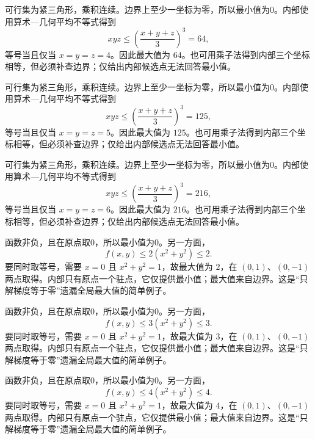 \documentclass[UTF8,12pt,a4paper,fontset=fandol]{ctexart}
\begin{document}
\begin{solve}\label{ans:c35q10}
可行集为紧三角形，乘积连续。边界上至少一坐标为零，所以最小值为0。内部使用算术—几何平均不等式得到
\[
xyz\le\left(\frac{x+y+z}3\right)^3=64,
\]
等号当且仅当 $x=y=z=4$。因此最大值为 $64$。也可用乘子法得到内部三个坐标相等，但必须补查边界；仅给出内部候选点无法回答最小值。
\end{solve}

\begin{solve}\label{ans:c35q11}
可行集为紧三角形，乘积连续。边界上至少一坐标为零，所以最小值为0。内部使用算术—几何平均不等式得到
\[
xyz\le\left(\frac{x+y+z}3\right)^3=125,
\]
等号当且仅当 $x=y=z=5$。因此最大值为 $125$。也可用乘子法得到内部三个坐标相等，但必须补查边界；仅给出内部候选点无法回答最小值。
\end{solve}

\begin{solve}\label{ans:c35q12}
可行集为紧三角形，乘积连续。边界上至少一坐标为零，所以最小值为0。内部使用算术—几何平均不等式得到
\[
xyz\le\left(\frac{x+y+z}3\right)^3=216,
\]
等号当且仅当 $x=y=z=6$。因此最大值为 $216$。也可用乘子法得到内部三个坐标相等，但必须补查边界；仅给出内部候选点无法回答最小值。
\end{solve}

\begin{solve}\label{ans:c35q13}
函数非负，且在原点取0，所以最小值为0。另一方面，
\[
f(x,y)\le 2(x^2+y^2)\le 2.
\]
要同时取等号，需要 $x=0$ 且 $x^2+y^2=1$，故最大值为 $2$，在 $(0,1)$、$(0,-1)$ 两点取得。内部只有原点一个驻点，它仅提供最小值；最大值来自边界。这是“只解梯度等于零”遗漏全局最大值的简单例子。
\end{solve}

\begin{solve}\label{ans:c35q14}
函数非负，且在原点取0，所以最小值为0。另一方面，
\[
f(x,y)\le 3(x^2+y^2)\le 3.
\]
要同时取等号，需要 $x=0$ 且 $x^2+y^2=1$，故最大值为 $3$，在 $(0,1)$、$(0,-1)$ 两点取得。内部只有原点一个驻点，它仅提供最小值；最大值来自边界。这是“只解梯度等于零”遗漏全局最大值的简单例子。
\end{solve}

\begin{solve}\label{ans:c35q15}
函数非负，且在原点取0，所以最小值为0。另一方面，
\[
f(x,y)\le 4(x^2+y^2)\le 4.
\]
要同时取等号，需要 $x=0$ 且 $x^2+y^2=1$，故最大值为 $4$，在 $(0,1)$、$(0,-1)$ 两点取得。内部只有原点一个驻点，它仅提供最小值；最大值来自边界。这是“只解梯度等于零”遗漏全局最大值的简单例子。
\end{solve}
\end{document}
